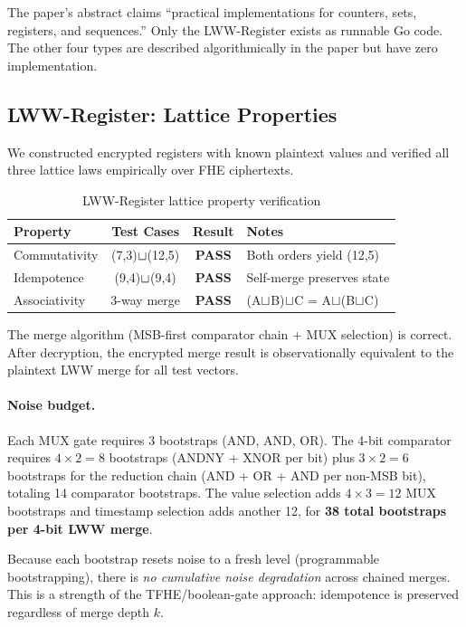 \documentclass{../shared/luxfhe}
\begin{document}
The paper's abstract claims ``practical implementations for counters,
sets, registers, and sequences.''  Only the LWW-Register exists as
runnable Go code.  The other four types are described algorithmically
in the paper but have zero implementation.

\subsection{LWW-Register: Lattice Properties}

We constructed encrypted registers with known plaintext values and
verified all three lattice laws empirically over FHE ciphertexts.

\begin{table}[h]
\centering
\caption{LWW-Register lattice property verification}
\label{tab:lattice}
\begin{tabular}{lccl}
\toprule
Property        & Test Cases & Result & Notes \\
\midrule
Commutativity   & (7,3)$\sqcup$(12,5) & \textbf{PASS} & Both orders yield (12,5) \\
Idempotence     & (9,4)$\sqcup$(9,4)  & \textbf{PASS} & Self-merge preserves state \\
Associativity   & 3-way merge        & \textbf{PASS} & (A$\sqcup$B)$\sqcup$C = A$\sqcup$(B$\sqcup$C) \\
\bottomrule
\end{tabular}
\end{table}

The merge algorithm (MSB-first comparator chain + MUX selection) is
correct.  After decryption, the encrypted merge result is
observationally equivalent to the plaintext LWW merge for all test
vectors.

\paragraph{Noise budget.}
Each MUX gate requires 3 bootstraps (AND, AND, OR).  The 4-bit
comparator requires $4 \times 2 = 8$ bootstraps (ANDNY + XNOR per
bit) plus $3 \times 2 = 6$ bootstraps for the reduction chain (AND +
OR + AND per non-MSB bit), totaling 14 comparator bootstraps.  The
value selection adds $4 \times 3 = 12$ MUX bootstraps and timestamp
selection adds another 12, for \textbf{38 total bootstraps per
4-bit LWW merge}.

Because each bootstrap resets noise to a fresh level (programmable
bootstrapping), there is \emph{no cumulative noise degradation} across
chained merges.  This is a strength of the TFHE/boolean-gate approach:
idempotence is preserved regardless of merge depth $k$.
\end{document}
